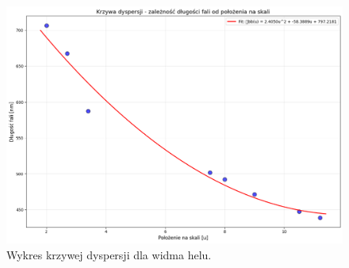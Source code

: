 \documentclass[a4paper,12pt]{article}
\begin{document}
\begin{figure}[H]
    \centering
    \includegraphics[width=1.4\textwidth,height=0.9\textheight,keepaspectratio,angle=90]{../images/helium_dispersion.png}
    \caption{Wykres krzywej dyspersji dla widma helu.}
    \label{fig:helium_dispersion}
\end{figure}

\newpage



\end{document}
